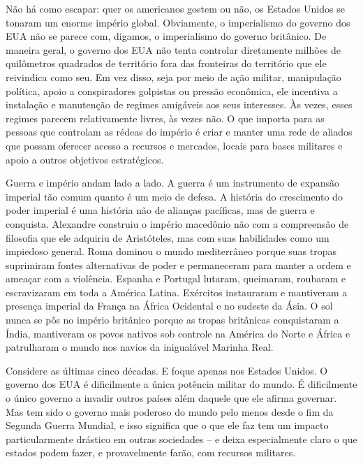 Não há como escapar: quer os americanos gostem ou não, os Estados Unidos se tonaram um enorme império global. Obviamente, o imperialismo do governo dos EUA não se parece com, digamos, o imperialismo do governo britânico. De maneira geral, o governo dos EUA não tenta controlar diretamente milhões de quilômetros quadrados de território fora das fronteiras do território que ele reivindica como seu. Em vez disso, seja por meio de ação militar, manipulação política, apoio a conspiradores golpistas ou pressão econômica, ele incentiva a instalação e manutenção de regimes amigáveis aos seus interesses. Às vezes, esses regimes parecem relativamente livres, às vezes não. O que importa para as pessoas que controlam as rédeas do império é criar e manter uma rede de aliados que possam oferecer acesso a recursos e mercados, locais para bases militares e apoio a outros objetivos estratégicos.

Guerra e império andam lado a lado. A guerra é um instrumento de expansão imperial tão comum quanto é um meio de defesa. A história do crescimento do poder imperial é uma história não de alianças pacíficas, mas de guerra e conquista. Alexandre construiu o império macedônio não com a compreensão de filosofia que ele adquiriu de Aristóteles, mas com suas habilidades como um impiedoso general. Roma dominou o mundo mediterrâneo porque suas tropas suprimiram fontes alternativas de poder e permaneceram para manter a ordem e ameaçar com a violência. Espanha e Portugal lutaram, queimaram, roubaram e escravizaram em toda a América Latina. Exércitos instauraram e mantiveram a presença imperial da França na África Ocidental e no sudeste da Ásia. O sol nunca se pôs no império britânico porque as tropas britânicas conquistaram a Índia, mantiveram os povos nativos sob controle na América do Norte e África e patrulharam o mundo nos navios da inigualável Marinha Real.

Considere as últimas cinco décadas. E foque apenas nos Estados Unidos. O governo dos EUA é dificilmente a única potência militar do mundo. É dificilmente o único governo a invadir outros países além daquele que ele afirma governar. Mas tem sido o governo mais poderoso do mundo pelo menos desde o fim da Segunda Guerra Mundial, e isso significa que o que ele faz tem um impacto particularmente drástico em outras sociedades -- e deixa especialmente claro o que estados podem fazer, e provavelmente farão, com recursos militares.

